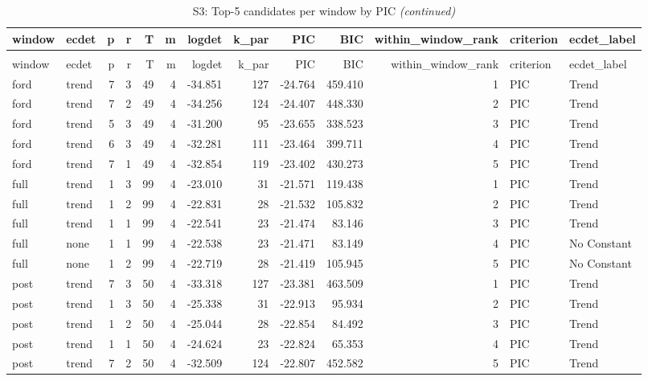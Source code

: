 \begingroup\fontsize{9}{11}\selectfont

\begin{longtable}[t]{llrrrrrrrrrll}
\caption{\label{tab:tab:S3_pic_top5}S3: Top-5 candidates per window by PIC}\\
\toprule
window & ecdet & p & r & T & m & logdet & k\_par & PIC & BIC & within\_window\_rank & criterion & ecdet\_label\\
\midrule
\endfirsthead
\caption[]{S3: Top-5 candidates per window by PIC \textit{(continued)}}\\
\toprule
window & ecdet & p & r & T & m & logdet & k\_par & PIC & BIC & within\_window\_rank & criterion & ecdet\_label\\
\midrule
\endhead

\endfoot
\bottomrule
\endlastfoot
ford & trend & 7 & 3 & 49 & 4 & -34.851 & 127 & -24.764 & 459.410 & 1 & PIC & Trend\\
ford & trend & 7 & 2 & 49 & 4 & -34.256 & 124 & -24.407 & 448.330 & 2 & PIC & Trend\\
ford & trend & 5 & 3 & 49 & 4 & -31.200 & 95 & -23.655 & 338.523 & 3 & PIC & Trend\\
ford & trend & 6 & 3 & 49 & 4 & -32.281 & 111 & -23.464 & 399.711 & 4 & PIC & Trend\\
ford & trend & 7 & 1 & 49 & 4 & -32.854 & 119 & -23.402 & 430.273 & 5 & PIC & Trend\\
\addlinespace
full & trend & 1 & 3 & 99 & 4 & -23.010 & 31 & -21.571 & 119.438 & 1 & PIC & Trend\\
full & trend & 1 & 2 & 99 & 4 & -22.831 & 28 & -21.532 & 105.832 & 2 & PIC & Trend\\
full & trend & 1 & 1 & 99 & 4 & -22.541 & 23 & -21.474 & 83.146 & 3 & PIC & Trend\\
full & none & 1 & 1 & 99 & 4 & -22.538 & 23 & -21.471 & 83.149 & 4 & PIC & No Constant\\
full & none & 1 & 2 & 99 & 4 & -22.719 & 28 & -21.419 & 105.945 & 5 & PIC & No Constant\\
\addlinespace
post & trend & 7 & 3 & 50 & 4 & -33.318 & 127 & -23.381 & 463.509 & 1 & PIC & Trend\\
post & trend & 1 & 3 & 50 & 4 & -25.338 & 31 & -22.913 & 95.934 & 2 & PIC & Trend\\
post & trend & 1 & 2 & 50 & 4 & -25.044 & 28 & -22.854 & 84.492 & 3 & PIC & Trend\\
post & trend & 1 & 1 & 50 & 4 & -24.624 & 23 & -22.824 & 65.353 & 4 & PIC & Trend\\
post & trend & 7 & 2 & 50 & 4 & -32.509 & 124 & -22.807 & 452.582 & 5 & PIC & Trend\\*
\end{longtable}
\endgroup{}

